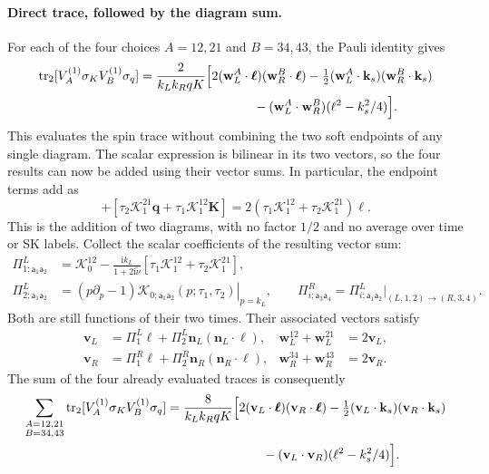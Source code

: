 \documentclass[a4paper,12pt]{article}
\newcommand{\ii}{\mathrm i}
\newcommand{\mb}{\mathbf}
\newcommand{\tn}{\tilde\nu}
\def\aa{\mathsf a}
\newcommand{\tr}{\operatorname{tr}}
\newcommand{\bq}{\mb q}
\newcommand{\bk}{\mb k}
\begin{document}
\paragraph{Direct trace, followed by the diagram sum.}
For each of the four choices $A=12,21$ and $B=34,43$, the Pauli
identity gives
\begin{align}
 \tr_2[V_A^{(1)}\sigma_KV_B^{(1)}\sigma_q]
 ={}&\frac{2}{k_Lk_RqK}
 \Big[
 2(\mb w_L^A\cdot\bm\ell)(\mb w_R^B\cdot\bm\ell)
 -\tfrac12(\mb w_L^A\cdot\bk_s)(\mb w_R^B\cdot\bk_s)
 \nonumber\\
 &\hspace{27mm}
 -(\mb w_L^A\cdot\mb w_R^B)(\ell^2-k_s^2/4)\Big].
 \label{eq:individual-direct-trace}
\end{align}
This evaluates the spin trace without combining the two soft
endpoints of any single diagram.
The scalar expression is bilinear in its two vectors, so the four
results can now be added using their vector sums. In particular,
the endpoint terms add as
\begin{equation}
 [\tau_1\mathcal K_1^{12}\bq+\tau_2\mathcal K_1^{21}\mb K]
 +[\tau_2\mathcal K_1^{21}\bq+\tau_1\mathcal K_1^{12}\mb K]
 =2(\tau_1\mathcal K_1^{12}+\tau_2\mathcal K_1^{21})\bm\ell.
 \label{eq:physical-endpoint-sum}
\end{equation}
This is the addition of two diagrams, with no factor $1/2$ and no
average over time or SK labels.
Collect the scalar coefficients of the resulting vector sum:
\begin{align}
 \Pi^L_{1;\aa_1\aa_2}
 &=\mathcal K_0^{12}
 -\frac{\ii k_L}{1+2\ii\tn}
 [\tau_1\mathcal K_1^{12}+\tau_2\mathcal K_1^{21}],\nonumber\\
 \Pi^L_{2;\aa_1\aa_2}
 &=\left.(p\partial_p-1)
 \mathcal K_{0;\aa_1\aa_2}(p;\tau_1,\tau_2)\right|_{p=k_L},
 \qquad
 \Pi^R_{i;\aa_3\aa_4}
 =\Pi^L_{i;\aa_1\aa_2}\big|_{(L,1,2)\to(R,3,4)}.
 \label{eq:time-integrand-coefficients}
\end{align}
Both are still functions of their two times. Their associated
vectors satisfy
\begin{align}
 \mb v_L&=\Pi^L_1\bm\ell+\Pi^L_2\mb n_L(\mb n_L\cdot\bm\ell),
 &\mb w_L^{12}+\mb w_L^{21}&=2\mb v_L,\nonumber\\
 \mb v_R&=\Pi^R_1\bm\ell+\Pi^R_2\mb n_R(\mb n_R\cdot\bm\ell),
 &\mb w_R^{34}+\mb w_R^{43}&=2\mb v_R.
 \label{eq:unintegrated-vectors}
\end{align}
The sum of the four already evaluated traces is consequently
\begin{align}
 \sum_{\substack{A=12,21\\B=34,43}}
 \tr_2[V_A^{(1)}\sigma_KV_B^{(1)}\sigma_q]
 ={}&\frac{8}{k_Lk_RqK}
 \Big[2(\mb v_L\cdot\bm\ell)(\mb v_R\cdot\bm\ell)
 -\tfrac12(\mb v_L\cdot\bk_s)(\mb v_R\cdot\bk_s)
 \nonumber\\
 &\hspace{22mm}
 -(\mb v_L\cdot\mb v_R)(\ell^2-k_s^2/4)\Big].
 \label{eq:pauli}
\end{align}
\end{document}
